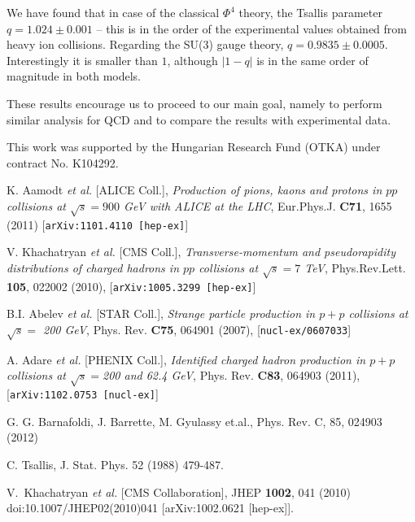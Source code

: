 \documentclass[aps,prd,twocolumn,showpacs,superscriptaddress,groupedaddress]{revtex4}  %
\begin{document}
We have found that in case of the classical $\Phi^4$ theory, the
Tsallis parameter $q=1.024\pm0.001$ -- this is in the order of the
experimental values obtained from heavy ion collisions. Regarding the
SU(3) gauge theory, $q=0.9835\pm0.0005$. Interestingly it is smaller
than $1$, although $|1-q|$ is in the same order of magnitude in both
models.

These results encourage us to proceed to our main goal, namely to
perform similar analysis for QCD and to compare the results with
experimental data.

This work was supported by the Hungarian Research
Fund (OTKA) under contract No. K104292.

\begin{thebibliography}{99}
K. Aamodt \textit{et al.} [ALICE Coll.],
\emph{Production of pions, kaons and protons in $pp$
                        collisions at $\sqrt{s}= 900$ GeV with ALICE at the LHC},
Eur.Phys.J. {\bf C71}, 1655 (2011)
[{\tt arXiv:1101.4110 [hep-ex]}]


V. Khachatryan \textit{et al.} [CMS Coll.],
\emph{Transverse-momentum and pseudorapidity distributions of
                        charged hadrons in $pp$ collisions at $\sqrt{s}=7$ TeV},
Phys.Rev.Lett. {\bf 105}, 022002 (2010),
[{\tt arXiv:1005.3299 [hep-ex]}]

B.I. Abelev \textit{et al.} [STAR Coll.],
\emph{Strange particle production in $p+p$ collisions at $\sqrt{s} =$ 200 GeV},
Phys. Rev. {\bf C75}, 064901 (2007),
[{\tt nucl-ex/0607033}]

A. Adare \textit{et al.} [PHENIX Coll.],
\emph{Identified charged hadron production in $p+p$ collisions at $\sqrt{s}=$200 and 62.4 GeV},
Phys. Rev. {\bf C83}, 064903 (2011),
[{\tt arXiv:1102.0753 [nucl-ex]}]

 G. G. Barnafoldi, J. Barrette, M. Gyulassy et.al.,
  Phys. Rev. C, 85, 024903 (2012)

 C. Tsallis, J. Stat. Phys. 52 (1988) 479-487.



  V.~Khachatryan {\it et al.} [CMS Collaboration],
  JHEP {\bf 1002}, 041 (2010)
  doi:10.1007/JHEP02(2010)041
  [arXiv:1002.0621 [hep-ex]].




\end{thebibliography}
\end{document}
